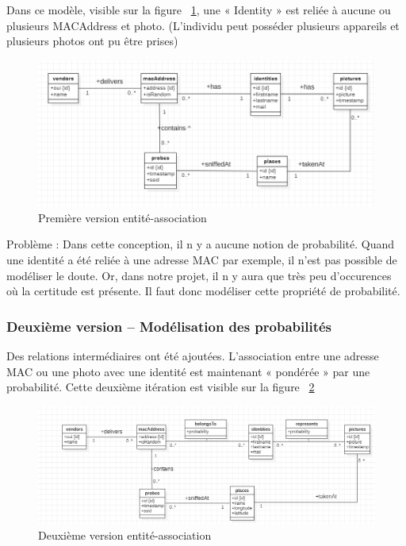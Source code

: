 Dans ce modèle, visible sur la figure ~\ref{fig:model-ea-1}, une « Identity » est reliée à aucune ou plusieurs MACAddress et photo. (L’individu peut posséder
plusieurs appareils et plusieurs photos ont pu être prises)

\begin{figure}[H]
	\centering
	\includegraphics[width=12cm]{images/database_1.png}
	\caption{Première version entité-association}
	\label{fig:model-ea-1}
\end{figure}

Problème : Dans cette conception, il n y a aucune notion de probabilité. Quand une identité a été reliée à une
adresse MAC par exemple, il n’est pas possible de modéliser le doute. Or, dans notre projet, il n y aura que très
peu d'occurences où la certitude est présente. Il faut donc modéliser cette propriété de probabilité.

\subsubsection{Deuxième version – Modélisation des probabilités}
Des relations intermédiaires ont été ajoutées. L’association entre une adresse MAC ou une photo avec une
identité est maintenant « pondérée » par une probabilité. Cette deuxième itération est visible sur la figure ~\ref{fig:model-ea-2}

\begin{figure}[H]
	\centering
	\includegraphics[width=12cm]{images/proto-2.png}
	\caption{Deuxième version entité-association}
	\label{fig:model-ea-2}
\end{figure}

